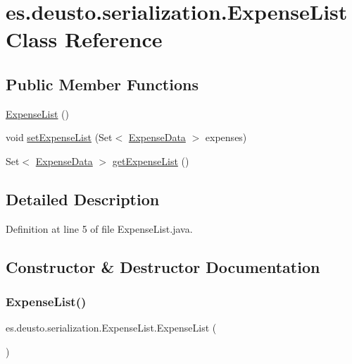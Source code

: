 \hypertarget{classes_1_1deusto_1_1serialization_1_1_expense_list}{}\section{es.\+deusto.\+serialization.\+Expense\+List Class Reference}
\label{classes_1_1deusto_1_1serialization_1_1_expense_list}
\subsection*{Public Member Functions}
\begin{DoxyCompactItemize}
\item 
\hyperlink{classes_1_1deusto_1_1serialization_1_1_expense_list_a899ae4c57bec201fe7fe90615c8b4c93}{Expense\+List} ()
\item 
void \hyperlink{classes_1_1deusto_1_1serialization_1_1_expense_list_a0ab9d9c259b8a4bcb1a1891f8ea85520}{set\+Expense\+List} (Set$<$ \hyperlink{classes_1_1deusto_1_1serialization_1_1_expense_data}{Expense\+Data} $>$ expenses)
\item 
Set$<$ \hyperlink{classes_1_1deusto_1_1serialization_1_1_expense_data}{Expense\+Data} $>$ \hyperlink{classes_1_1deusto_1_1serialization_1_1_expense_list_aa54bbdc7fde1b0c4f6be8e5af053f4c4}{get\+Expense\+List} ()
\end{DoxyCompactItemize}


\subsection{Detailed Description}


Definition at line 5 of file Expense\+List.\+java.



\subsection{Constructor \& Destructor Documentation}
\mbox{\label{classes_1_1deusto_1_1serialization_1_1_expense_list_a899ae4c57bec201fe7fe90615c8b4c93}} 
\subsubsection{\texorpdfstring{Expense\+List()}{ExpenseList()}}
{\footnotesize\ttfamily es.\+deusto.\+serialization.\+Expense\+List.\+Expense\+List (\begin{DoxyParamCaption}{ }\end{DoxyParamCaption})}



